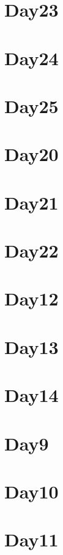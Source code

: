 
\section*{Day23}

\vfill
\section*{Day24}

\vfill
\section*{Day25}

\vfill
\section*{Day20}

\vfill
\section*{Day21}

\vfill
\section*{Day22}

\vfill
\section*{Day12}

\vfill
\section*{Day13}

\vfill
\section*{Day14}

\vfill
\section*{Day9}

\vfill
\section*{Day10}

\vfill
\section*{Day11}

\vfill
